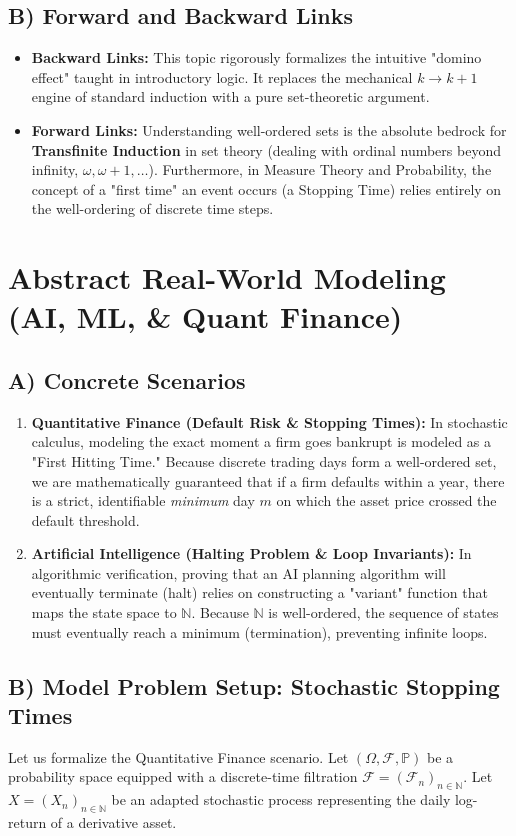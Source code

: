 \documentclass[11pt, a4paper]{article}
\theoremstyle{definition}
\theoremstyle{remark}
\newcommand{\N}{\mathbb{N}}
\newcommand{\Prob}{\mathbb{P}}
\newcommand{\F}{\mathcal{F}}
\begin{document}
\subsection{B) Forward and Backward Links}
\begin{itemize}
    \item \textbf{Backward Links:} This topic rigorously formalizes the intuitive "domino effect" taught in introductory logic. It replaces the mechanical $k \to k+1$ engine of standard induction with a pure set-theoretic argument.
    \item \textbf{Forward Links:} Understanding well-ordered sets is the absolute bedrock for \textbf{Transfinite Induction} in set theory (dealing with ordinal numbers beyond infinity, $\omega, \omega+1, \dots$). Furthermore, in Measure Theory and Probability, the concept of a "first time" an event occurs (a Stopping Time) relies entirely on the well-ordering of discrete time steps.
\end{itemize}

\section{Abstract Real-World Modeling (AI, ML, \& Quant Finance)}

\subsection{A) Concrete Scenarios}
\begin{enumerate}
    \item \textbf{Quantitative Finance (Default Risk \& Stopping Times):} In stochastic calculus, modeling the exact moment a firm goes bankrupt is modeled as a "First Hitting Time." Because discrete trading days form a well-ordered set, we are mathematically guaranteed that if a firm defaults within a year, there is a strict, identifiable \textit{minimum} day $m$ on which the asset price crossed the default threshold.
    \item \textbf{Artificial Intelligence (Halting Problem \& Loop Invariants):} In algorithmic verification, proving that an AI planning algorithm will eventually terminate (halt) relies on constructing a "variant" function that maps the state space to $\N$. Because $\N$ is well-ordered, the sequence of states must eventually reach a minimum (termination), preventing infinite loops.
\end{enumerate}

\subsection{B) Model Problem Setup: Stochastic Stopping Times}
Let us formalize the Quantitative Finance scenario. Let $(\Omega, \F, \Prob)$ be a probability space equipped with a discrete-time filtration $\F = (\F_n)_{n \in \N}$. Let $X = (X_n)_{n \in \N}$ be an adapted stochastic process representing the daily log-return of a derivative asset. 
\end{document}
